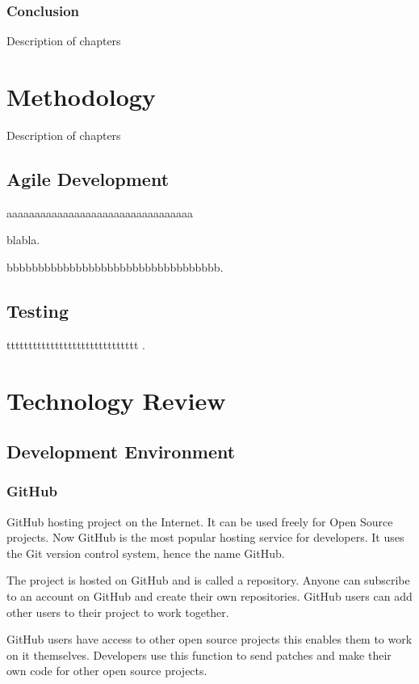 \subsection{Conclusion}
Description of chapters

\chapter{Methodology}
Description of chapters

\section{Agile Development}
aaaaaaaaaaaaaaaaaaaaaaaaaaaaaaaaa\par
blabla\cite{FirstnameLastname}.\par
bbbbbbbbbbbbbbbbbbbbbbbbbbbbbbbbbb\cite{NameOfreff}.

\section{Testing}
tttttttttttttttttttttttttttttt
\cite{FirstnameLastname}.


\chapter{Technology Review}

\section{Development Environment}

\subsection{GitHub}
GitHub hosting project on the Internet. It can be used freely for Open Source projects. Now GitHub is the most popular hosting service for developers. It uses the Git version control system, hence the name GitHub.\par

The project is hosted on GitHub and is called a repository. Anyone can subscribe to an account on GitHub and create their own repositories. GitHub users can add other users to their project to work together.\par

GitHub users have access to other open source projects this enables them to work on it themselves. Developers use this function to send patches and make their own code for other open source projects.\par 

